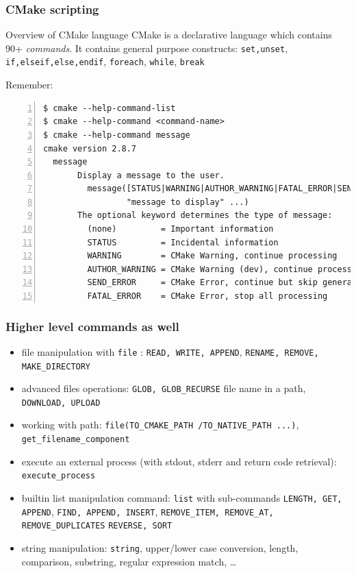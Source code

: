 \documentclass[compress,slidestop,table,usepdftitle=false
              ]
               {beamer}
\begin{document}
\begin{frame}[fragile]
\frametitle{CMake scripting}
\begin{block}{Overview of CMake language}
CMake is a declarative language which contains 90+ \emph{commands}.
It contains general purpose constructs:
\lstinline!set,unset!,
\lstinline!if,elseif,else,endif!,
\lstinline!foreach!,
\lstinline!while!, \lstinline!break!
\end{block}
Remember:
\begin{Verbatim}[fontsize=\tiny,numbers=left]
$ cmake --help-command-list
$ cmake --help-command <command-name>
$ cmake --help-command message
cmake version 2.8.7
  message
       Display a message to the user.
         message([STATUS|WARNING|AUTHOR_WARNING|FATAL_ERROR|SEND_ERROR]
                 "message to display" ...)
       The optional keyword determines the type of message:
         (none)         = Important information
         STATUS         = Incidental information
         WARNING        = CMake Warning, continue processing
         AUTHOR_WARNING = CMake Warning (dev), continue processing
         SEND_ERROR     = CMake Error, continue but skip generation
         FATAL_ERROR    = CMake Error, stop all processing
\end{Verbatim}
\end{frame}

\begin{frame}[fragile]
\frametitle{Higher level commands as well}
\lstset{basicstyle=\scriptsize}
\begin{itemize}
\item file manipulation with \lstinline[basicstyle=\normalsize]!file! : \lstinline!READ, WRITE, APPEND!,
      \lstinline!RENAME, REMOVE, MAKE_DIRECTORY!
      
\item advanced files operations: \lstinline!GLOB, GLOB_RECURSE! file name in a path,
      \lstinline!DOWNLOAD, UPLOAD!
\item working with path: \lstinline[basicstyle=\normalsize]!file!\lstinline!(TO_CMAKE_PATH /TO_NATIVE_PATH ...)!, \lstinline[basicstyle=\normalsize]!get_filename_component!
\item execute an external process (with stdout, stderr and return code retrieval): \lstinline[basicstyle=\normalsize]!execute_process!
\item builtin list manipulation command: \lstinline[basicstyle=\normalsize]!list! with sub-commands
      \lstinline!LENGTH, GET, APPEND!,
      \lstinline!FIND, APPEND, INSERT!,
      \lstinline!REMOVE_ITEM, REMOVE_AT, REMOVE_DUPLICATES!
      \lstinline!REVERSE, SORT!
\item string manipulation: \lstinline[basicstyle=\normalsize]!string!, upper/lower case conversion, length, comparison,
      substring, regular expression match, \ldots
\end{itemize}
\lstset{basicstyle=\normalsize}
\end{frame}
\end{document}
